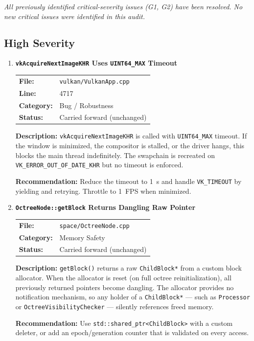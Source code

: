 \documentclass[a4paper,12pt]{article}
\newcommand{\severitybox}[2]{%
  \colorbox{#1}{\makebox[2.5cm][c]{\textcolor{white}{\textbf{#2}}}}%
}
\begin{document}
\textit{All previously identified critical-severity issues (G1, G2) have been
resolved. No new critical issues were identified in this audit.}

\newpage

\subsection{High Severity}

\begin{enumerate}[leftmargin=*]

\item[\textbf{[B4]}] \textbf{\texttt{vkAcquireNextImageKHR} Uses \texttt{UINT64\_MAX} Timeout}
  \hfill \severitybox{highcolor}{HIGH}

  \begin{tabular}{ll}
    \textbf{File:} & \texttt{vulkan/VulkanApp.cpp} \\
    \textbf{Line:} & 4717 \\
    \textbf{Category:} & Bug / Robustness \\
    \textbf{Status:} & Carried forward (unchanged) \\
  \end{tabular}

  \textbf{Description:}
  \texttt{vkAcquireNextImageKHR} is called with \texttt{UINT64\_MAX} timeout.
  If the window is minimized, the compositor is stalled, or the driver hangs,
  this blocks the main thread indefinitely. The swapchain is recreated on
  \texttt{VK\_ERROR\_OUT\_OF\_DATE\_KHR} but no timeout is enforced.

  \textbf{Recommendation:}
  Reduce the timeout to 1~s and handle \texttt{VK\_TIMEOUT} by yielding and
  retrying. Throttle to 1~FPS when minimized.

\item[\textbf{[P7]}] \textbf{\texttt{OctreeNode::getBlock} Returns Dangling Raw Pointer}
  \hfill \severitybox{highcolor}{HIGH}

  \begin{tabular}{ll}
    \textbf{File:} & \texttt{space/OctreeNode.cpp} \\
    \textbf{Category:} & Memory Safety \\
    \textbf{Status:} & Carried forward (unchanged) \\
  \end{tabular}

  \textbf{Description:}
  \texttt{getBlock()} returns a raw \texttt{ChildBlock*} from a custom
  block allocator. When the allocator is reset (on full octree
  reinitialization), all previously returned pointers become dangling. The
  allocator provides no notification mechanism, so any holder of a
  \texttt{ChildBlock*} — such as \texttt{Processor} or
  \texttt{OctreeVisibilityChecker} — silently references freed memory.

  \textbf{Recommendation:}
  Use \texttt{std::shared\_ptr<ChildBlock>} with a custom deleter, or add an
  epoch/generation counter that is validated on every access.

\end{enumerate}
\end{document}
